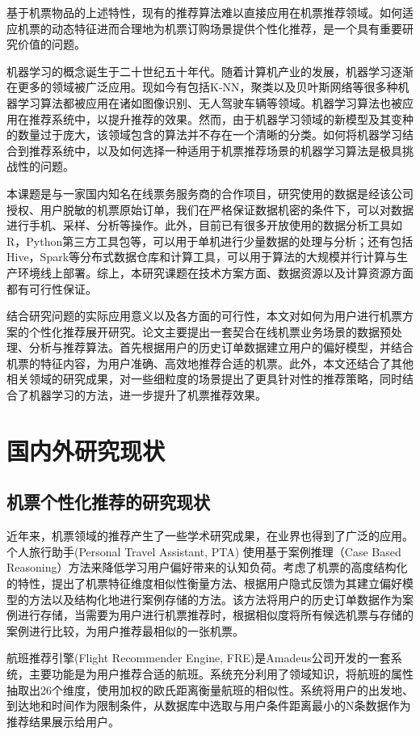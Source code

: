 基于机票物品的上述特性，现有的推荐算法难以直接应用在机票推荐领域。如何适应机票的动态特征进而合理地为机票订购场景提供个性化推荐，是一个具有重要研究价值的问题。

机器学习的概念诞生于二十世纪五十年代\cite{portugal2015use}。随着计算机产业的发展，机器学习逐渐在更多的领域被广泛应用。现如今有包括K-NN，聚类以及贝叶斯网络等很多种机器学习算法都被应用在诸如图像识别、无人驾驶车辆等领域。机器学习算法也被应用在推荐系统中，以提升推荐的效果。然而，由于机器学习领域的新模型及其变种的数量过于庞大，该领域包含的算法并不存在一个清晰的分类。如何将机器学习结合到推荐系统中，以及如何选择一种适用于机票推荐场景的机器学习算法是极具挑战性的问题。

本课题是与一家国内知名在线票务服务商的合作项目，研究使用的数据是经该公司授权、用户脱敏的机票原始订单，我们在严格保证数据机密的条件下，可以对数据进行手机、采样、分析等操作。此外，目前已有很多开放使用的数据分析工具如R，Python第三方工具包等，可以用于单机进行少量数据的处理与分析；还有包括Hive，Spark等分布式数据仓库和计算工具，可以用于算法的大规模并行计算与生产环境线上部署。综上，本研究课题在技术方案方面、数据资源以及计算资源方面都有可行性保证。

结合研究问题的实际应用意义以及各方面的可行性，本文对如何为用户进行机票方案的个性化推荐展开研究。论文主要提出一套契合在线机票业务场景的数据预处理、分析与推荐算法。首先根据用户的历史订单数据建立用户的偏好模型，并结合机票的特征内容，为用户准确、高效地推荐合适的机票。此外，本文还结合了其他相关领域的研究成果，对一些细粒度的场景提出了更具针对性的推荐策略，同时结合了机器学习的方法，进一步提升了机票推荐效果。

\section{国内外研究现状}
\subsection{机票个性化推荐的研究现状}
近年来，机票领域的推荐产生了一些学术研究成果，在业界也得到了广泛的应用。个人旅行助手(Personal Travel Assistant, PTA)\cite{coyle2004making} 使用基于案例推理（Case Based Reasoning）\cite{richter2013case,kolodner2014case}方法来降低学习用户偏好带来的认知负荷。考虑了机票的高度结构化的特性，提出了机票特征维度相似性衡量方法、根据用户隐式反馈为其建立偏好模型的方法以及结构化地进行案例存储的方法。该方法将用户的历史订单数据作为案例进行存储，当需要为用户进行机票推荐时，根据相似度将所有候选机票与存储的案例进行比较，为用户推荐最相似的一张机票。

航班推荐引擎(Flight Recommender Engine, FRE)\cite{barth2014design}是Amadeus公司开发的一套系统，主要功能是为用户推荐合适的航班。系统充分利用了领域知识，将航班的属性抽取出26个维度，使用加权的欧氏距离衡量航班的相似性。系统将用户的出发地、到达地和时间作为限制条件，从数据库中选取与用户条件距离最小的N条数据作为推荐结果展示给用户。

